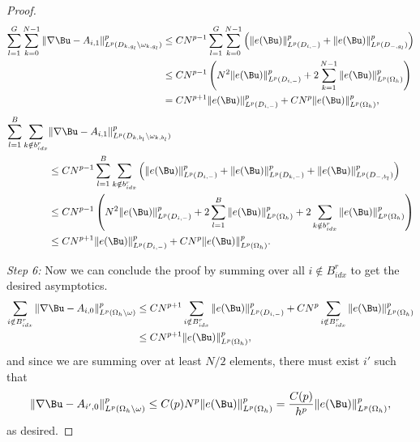 \begin{proof}
    
    \begin{align*}
    \sum_{l=1}^G\sum_{k=0}^{N-1}\|\nabla  \Bu- A_{i,1}\|^p_{L^p(D_{k,g_l}\backslash \omega_{k,g_l})} &\leq CN^{p-1}\sum_{l=1}^G\sum_{k=0}^{N-1}  \left(\|e(\Bu)\|^p_{L^p(D_{i,-})}+\|e(\Bu)\|^p_{L^p(D_{-,g_l})}\right)\\
        &\leq C N^{p-1}\left( N^2\|e(\Bu)\|^p_{L^p(D_{i,-})}+ 2\sum_{k=1}^{N-1} \|e(\Bu)\|^p_{L^p(\Omega_h)} \right) \\
        &= CN^{p+1} \|e(\Bu)\|^p_{L^p(D_{i,-})} + C N^p \|e(\Bu)\|^p_{L^p(\Omega_h)} ,
    \end{align*}
    \begin{align*}
    \sum_{l=1}^B\sum_{k\notin b^r_{idx}}&\|\nabla \Bu- A_{i,1}\|^p_{L^p(D_{k,b_l}\backslash \omega_{k,b_l})}   \\ &\leq C N^{p-1} \sum_{l=1}^B\sum_{k\notin b^r_{idx}}\left(\|e(\Bu)\|^p_{L^p(D_{i,-})}+\|e(\Bu)\|^p_{L^p(D_{k,-})}+\|e(\Bu)\|^p_{L^p(D_{-,b_l})}\right)\\
        &\leq CN^{p-1} \left(N^2\|e(\Bu)\|^p_{L^p(D_{i,-})} + 2\sum_{l=1}^B \|e(\Bu)\|^p_{L^p(\Omega_h)} + 2\sum_{k\notin b^r_{idx}} \|e(\Bu)\|^p_{L^p(\Omega_h)} \right) \\
        &\leq CN^{p+1}\|e(\Bu)\|^p_{L^p(D_{i,-})} +C N^p \|e(\Bu)\|^p_{L^p(\Omega_h)}. 
    \end{align*}
    
    \textit{Step 6:} Now we can conclude the proof by summing over all $i\notin B^r_{idx}$  to get the desired asymptotics.
    \begin{align*}
        \sum_{i\notin B^r_{idx}} \|\nabla \Bu - A_{i,0}\|^p_{L^p(\Omega_h\backslash\omega)}&\leq C N^{p+1}\sum_{i\notin B^r_{idx}}  \|e(\Bu)\|^p_{L^p(D_{i,-})}+ C N^p\sum_{i\notin B^r_{idx}}\|e(\Bu)\|^p_{L^p(\Omega_h)}\\
        &\leq CN^{p+1}\|e(\Bu)\|^p_{L^p(\Omega_h)},
    \end{align*}
    and since  we are summing over at least $N/2$ elements, there must exist $i'$ such that
    $$ \|\nabla \Bu - A_{i',0}\|^p_{L^p(\Omega_h\backslash\omega)}\leq  C(p)N^{p}\|e(\Bu)\|^p_{L^p(\Omega_h)}=\frac{C(p)}{h^p}\|e(\Bu)\|^p_{L^p(\Omega_h)},$$
    as desired.
    
    \end{proof}
    